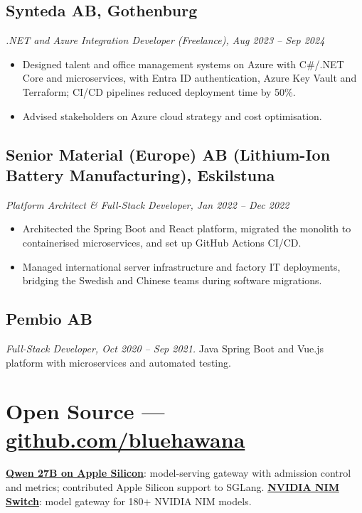 \documentclass[a4paper,10pt]{article}
\begin{document}
\subsection*{Synteda AB, Gothenburg}
\textit{.NET and Azure Integration Developer (Freelance), Aug 2023 -- Sep 2024}
\begin{itemize}
  \item Designed talent and office management systems on Azure with C\#/.NET Core and microservices, with Entra ID authentication, Azure Key Vault and Terraform; CI/CD pipelines reduced deployment time by 50\%.
  \item Advised stakeholders on Azure cloud strategy and cost optimisation.
\end{itemize}


\subsection*{Senior Material (Europe) AB (Lithium-Ion Battery Manufacturing), Eskilstuna}
\textit{Platform Architect \& Full-Stack Developer, Jan 2022 -- Dec 2022}
\begin{itemize}
  \item Architected the Spring Boot and React platform, migrated the monolith to containerised microservices, and set up GitHub Actions CI/CD.
  \item Managed international server infrastructure and factory IT deployments, bridging the Swedish and Chinese teams during software migrations.
\end{itemize}


\subsection*{Pembio AB}
\textit{Full-Stack Developer, Oct 2020 -- Sep 2021.} Java Spring Boot and Vue.js platform with microservices and automated testing.


\section*{Open Source --- \href{https://github.com/bluehawana}{github.com/bluehawana}}
\textbf{\href{https://github.com/bluehawana/Qwen3.827B-SGLang-mpbm5max}{Qwen 27B on Apple Silicon}}: model-serving gateway with admission control and metrics; contributed Apple Silicon support to SGLang. \textbf{\href{https://github.com/bluehawana/nvidia-nim-switch-python}{NVIDIA NIM Switch}}: model gateway for 180+ NVIDIA NIM models.
\end{document}
